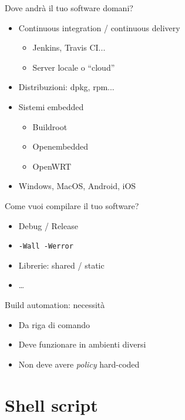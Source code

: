 \documentclass[xetex,table]{beamer}
\begin{document}
\begin{frame}{Dove andrà il tuo software domani?}
  \begin{itemize}
  \item Continuous integration / continuous delivery
    \begin{itemize}
    \item Jenkins, Travis CI...
    \item Server locale o ``cloud''
    \end{itemize}
    \pause
  \item Distribuzioni: dpkg, rpm...
    \pause
  \item Sistemi embedded
    \begin{itemize}
    \item Buildroot
    \item Openembedded
    \item OpenWRT
    \end{itemize}
    \pause
  \item Windows, MacOS, Android, iOS
  \end{itemize}
\end{frame}

\begin{frame}{Come vuoi compilare il tuo software?}
  \begin{itemize}
  \item Debug / Release
  \item \texttt{-Wall -Werror}
  \item Librerie: shared / static
  \item \dots
  \end{itemize}
\end{frame}

\begin{frame}{Build automation: necessità}
  \begin{itemize}
  \item Da riga di comando
  \item Deve funzionare in ambienti diversi
  \item Non deve avere {\em policy} hard-coded
  \end{itemize}
\end{frame}

\section{Shell script}

\end{document}
